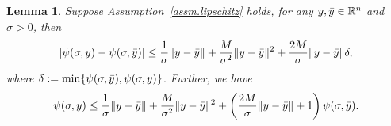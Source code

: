 \documentclass{article}
\newtheorem{lemma}[theorem]{Lemma}
\numberwithin{equation}{section}
\numberwithin{equation}{section}
\begin{document}
\begin{lemma}
    \label{lem.psi property wrt y}
    Suppose Assumption~\ref{assm.lipschitz} holds, for any $y,\Bar{y} \in \mathbb{R}^n$ and $\sigma>0$, then
    \begin{equation}
        \label{eq.psi property wrt y}
        \left \vert \psi(\sigma,y)-\psi(\sigma,\Bar{y}) \right\vert \leq \frac{1}{\sigma}\|y-\Bar{y}\| +\frac{M}{\sigma^2}\|y-\Bar{y}\|^2 +\frac{2M}{\sigma}\|y-\Bar{y}\|\delta,
    \end{equation}
    where $\delta:=\min\{\psi(\sigma,\Bar{y}),\psi(\sigma,y)\}$. Further, we have
    \begin{equation}
        \label{eq.psi property wrt y advanced}
        \psi(\sigma,y) \leq \frac{1}{\sigma}\|y-\Bar{y}\| +\frac{M}{\sigma^2}\|y-\Bar{y}\|^2 +\left(\frac{2M}{\sigma}\|y-\Bar{y}\|+1\right)\psi(\sigma,\Bar{y}).
    \end{equation}
\end{lemma}
\end{document}
